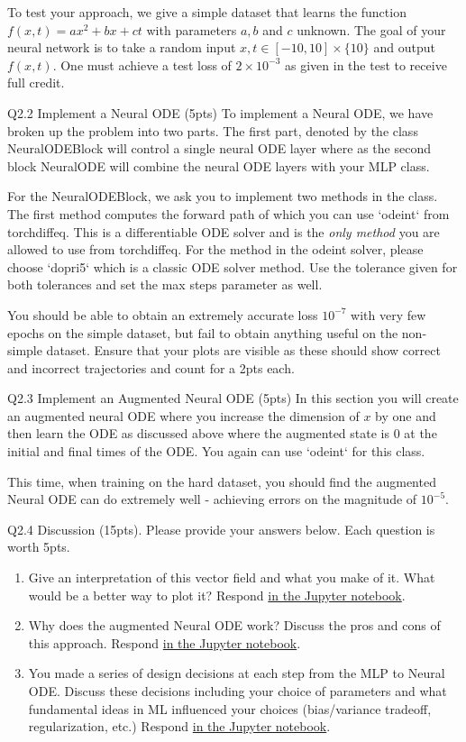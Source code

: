 \documentclass[12pt,letterpaper, onecolumn]{exam}
\theoremstyle{definition}
\begin{document}
To test your approach, we give a simple dataset that learns the function $f(x, t) = ax^2 + bx+ct$ with parameters $a, b$ and $c$ unknown. The goal of your neural network is to take a random input $x, t \in [-10, 10] \times \{10\}$ and output $f(x, t)$. One must achieve a test loss of $2 \times 10^{-3}$ as given in the test to receive full credit.  

\color{orange} Q2.2 Implement a Neural ODE (5pts) \color{black} To implement a Neural ODE, we have broken up the problem into two parts. The first part, denoted by the class NeuralODEBlock will control a single neural ODE layer where as the second block NeuralODE will combine the neural ODE layers with your MLP class.  

For the NeuralODEBlock, we ask you to implement two methods in the class. The first method computes the forward path of which you can use `odeint` from torchdiffeq. This is a differentiable ODE solver and is the \emph{only method} you are allowed to use from torchdiffeq. For the method in the odeint solver, please choose `dopri5` which is a classic ODE solver method. Use the tolerance given for both tolerances and set the max steps parameter as well. 

You should be able to obtain an extremely accurate loss $10^{-7}$ with very few epochs on the simple dataset, but fail to obtain anything useful on the non-simple dataset. Ensure that your plots are visible as these should show correct and incorrect trajectories and count for a 2pts each. 

\color{orange} Q2.3 Implement an Augmented Neural ODE (5pts) \color{black}
In this section you will create an augmented neural ODE where you increase the dimension of $x$ by one and then learn the ODE as discussed above where the augmented state is $0$ at the initial and final times of the ODE. You again can use `odeint` for this class. 

This time, when training on the hard dataset, you should find the augmented Neural ODE can do extremely well - achieving errors on the magnitude of $10^{-5}$. 

\color{orange} Q2.4 Discussion (15pts). \color{black} Please provide your answers below. Each question is worth 5pts.
\begin{enumerate}
    \item Give an interpretation of this vector field and what you make of it. What would be a better way to plot it? Respond \underline{in the Jupyter notebook}.

     \item Why does the augmented Neural ODE work? Discuss the pros and cons of this approach. Respond \underline{in the Jupyter notebook}.

     \item You made a series of design decisions at each step from the MLP to Neural ODE.  Discuss these decisions including your choice of parameters and what fundamental ideas in ML influenced your choices (bias/variance tradeoff, regularization, etc.) Respond \underline{in the Jupyter notebook}.

\end{enumerate}
\end{document}
